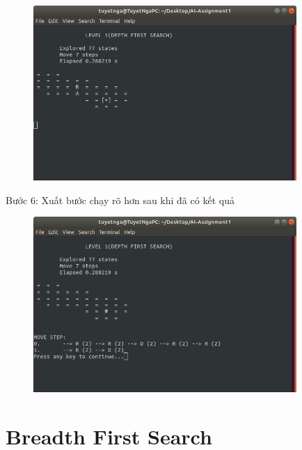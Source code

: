 \documentclass[11pt,a4paper]{article}
\begin{document}
\begin{center}
	\begin{figure}[htp]
		\begin{center}
			\includegraphics[width=10cm]{Images/depth5.png}
		\end{center}
		\caption{\label{fig:depth5}}
	\end{figure}
\end{center}
\begin{flushleft}
	\hspace{2 cm}	Bước 6: Xuất bước chạy rõ hơn sau khi đã có kết quả
\end{flushleft}
\begin{center}
	\begin{figure}[htp]
		\begin{center}
			\includegraphics[width=10cm]{Images/depth6.png}
		\end{center}
		\caption{\label{fig:depth6}}
	\end{figure}
\end{center}
\newpage

\section{Breadth First Search}
\end{document}
